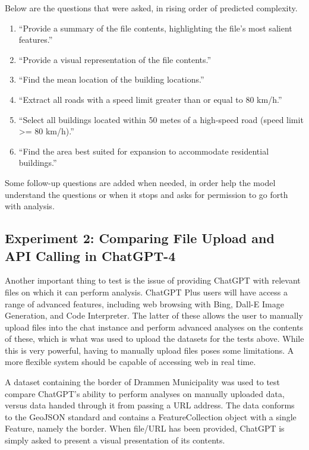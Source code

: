 Below are the questions that were asked, in rising order of predicted complexity.

\begin{enumerate}
    \item \enquote{Provide a summary of the file contents, highlighting the file's most salient features.}
    \item \enquote{Provide a visual representation of the file contents.}
    \item \enquote{Find the mean location of the building locations.}
    \item \enquote{Extract all roads with a speed limit greater than or equal to 80 km/h.}
    \item \enquote{Select all buildings located within 50 metes of a high-speed road (speed limit >= 80 km/h).}
    \item \enquote{Find the area best suited for expansion to accommodate residential buildings.}
\end{enumerate}
\label{enum:gpt-gis-questions}

Some follow-up questions are added when needed, in order help the model understand the questions or when it stops and asks for permission to go forth with analysis.

\subsection{Experiment 2: Comparing File Upload and API Calling in ChatGPT-4}

Another important thing to test is the issue of providing ChatGPT with relevant files on which it can perform analysis. ChatGPT Plus users will have access a range of advanced features, including web browsing with Bing, Dall-E Image Generation, and Code Interpreter. The latter of these allows the user to manually upload files into the chat instance and perform advanced analyses on the contents of these, which is what was used to upload the datasets for the tests above. While this is very powerful, having to manually upload files poses some limitations. A more flexible system should be capable of accessing web  in real time.

A dataset containing the border of Drammen Municipality was used to test compare ChatGPT's ability to perform analyses on manually uploaded data, versus data handed through it from passing a URL address. The data conforms to the GeoJSON standard and contains a FeatureCollection object with a single Feature, namely the border. When file/URL has been provided, ChatGPT is simply asked to present a visual presentation of its contents.

